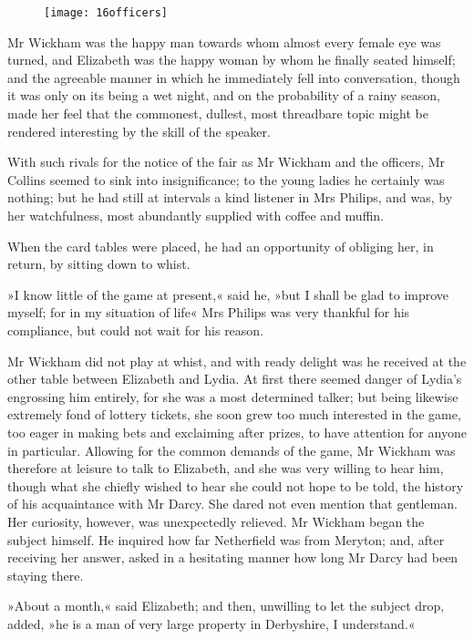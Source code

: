\begin{figure}[tbh]
\centering
\texttt{[image: 16officers]}
\end{figure}


Mr Wickham was the happy man towards whom almost every female eye was turned, and Elizabeth was the happy woman by whom he finally seated himself; and the agreeable manner in which he immediately fell into conversation, though it was only on its being a wet night, and on the probability of a rainy season, made her feel that the commonest, dullest, most threadbare topic might be rendered interesting by the skill of the speaker.

With such rivals for the notice of the fair as Mr Wickham and the officers, Mr Collins seemed to sink into insignificance; to the young ladies he certainly was nothing; but he had still at intervals a kind listener in Mrs Philips, and was, by her watchfulness, most abundantly supplied with coffee and muffin.

When the card tables were placed, he had an opportunity of obliging her, in return, by sitting down to whist.

»I know little of the game at present,« said he, »but I shall be glad to improve myself; for in my situation of life\longdash« Mrs Philips was very thankful for his compliance, but could not wait for his reason.

Mr Wickham did not play at whist, and with ready delight was he received at the other table between Elizabeth and Lydia. At first there seemed danger of Lydia's engrossing him entirely, for she was a most determined talker; but being likewise extremely fond of lottery tickets, she soon grew too much interested in the game, too eager in making bets and exclaiming after prizes, to have attention for anyone in particular. Allowing for the common demands of the game, Mr Wickham was therefore at leisure to talk to Elizabeth, and she was very willing to hear him, though what she chiefly wished to hear she could not hope to be told, the history of his acquaintance with Mr Darcy. She dared not even mention that gentleman. Her curiosity, however, was unexpectedly relieved. Mr Wickham began the subject himself. He inquired how far Netherfield was from Meryton; and, after receiving her answer, asked in a hesitating manner how long Mr Darcy had been staying there.

»About a month,« said Elizabeth; and then, unwilling to let the subject drop, added, »he is a man of very large property in Derbyshire, I understand.«

